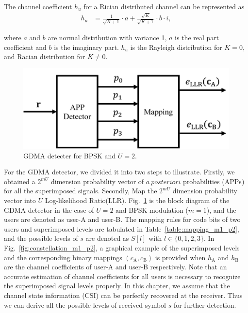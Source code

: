 The channel coefficient $h_u$ for a Rician distributed channel can be represented as
\begin{align} \label{equ:rx_sup}
 h_{u} &=\frac{1}{\sqrt{K+1}} \cdot a+\frac{\sqrt{K}}{\sqrt{K+1}}\cdot b \cdot i,
\end{align}

where $a$ and $b$ are normal distribution with variance 1, $a$ is the real part coefficient and $b$ is the imaginary part. $h_{u}$ is the Rayleigh distribution for $K=0$, and Racian distribution for $K\ne0$.


 \begin{figure}[H]
 \centering
 \includegraphics[width=12cm]{fig/gdma_bpsk_u2.png}
 \caption{GDMA detecter for BPSK and $U=2$.}
 \label{fig:gdma_bpsk_u2}
\end{figure}

For the GDMA detector, we divided it into two steps to illustrate.  Firstly, we obtained a $2^{mU}$ dimension probability vector of $a \ posteriori$ probabilities (APPs) for all the superimposed signals. Secondly, Map the $2^{mU}$ dimension probability vector into $U$ Log-likelihood Ratio(LLR). Fig.~\ref{fig:gdma_bpsk_u2} is the block diagram of the GDMA detector in the case of $U = 2$ and BPSK modulation ($m=1$), and the users are denoted as user-A and user-B. The mapping rules for code bits of two users and superimposed levels are tabulated in Table~\ref{table:mapping_m1_p2}, and the possible levels of $s$ are denoted as $S[l]$ with $l \in \{0, 1, 2, 3\}$. In Fig.~\ref{fig:constellation_m1_p2}, a graphical example of the superimposed levels and the corresponding binary mappings $(c_\text{A}, c_\text{B})$ is provided when $h_{\text{A}}$ and $h_{\text{B}}$ are the channel coefficients of user-A and user-B respectively. Note that an accurate estimation of channel coefficients for all users is necessary to recognize the superimposed signal levels properly. In this chapter, we assume that the channel state information (CSI) can be perfectly recovered at the receiver. Thus we can derive all the possible levels of received symbol $s$ for further detection.  

